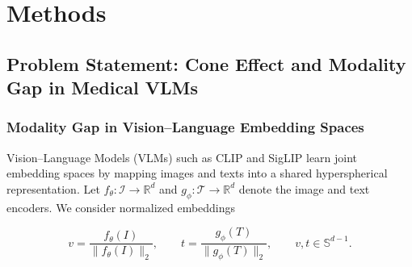 \documentclass[runningheads]{llncs}
\begin{document}



\section{Methods}
\label{sec:methods}

\subsection{Problem Statement: Cone Effect and Modality Gap in Medical VLMs}
\label{sec:problem_theory}

\subsubsection{Modality Gap in Vision--Language Embedding Spaces}
\label{sec:modality_gap}

Vision--Language Models (VLMs) such as CLIP and SigLIP learn joint embedding spaces by mapping images and texts into a shared hyperspherical representation. Let $f_\theta:\mathcal{I}\rightarrow\mathbb{R}^d$ and $g_\phi:\mathcal{T}\rightarrow\mathbb{R}^d$ denote the image and text encoders. We consider normalized embeddings

\begin{equation}
v=\frac{f_\theta(I)}{\|f_\theta(I)\|_2},
\qquad
t=\frac{g_\phi(T)}{\|g_\phi(T)\|_2},
\qquad
v,t\in\mathbb{S}^{d-1}.
\end{equation}
\end{document}
